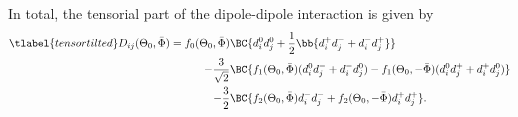 In total, the tensorial part of the dipole-dipole interaction is given by
\begin{align} \tlabel{tensortilted}
    D_{ij}(\Theta_0, \bar\Phi) = f_0(\Theta_0, \bar \Phi) &\BC{ d_i^0 d_j^0 + \frac{1}{2}\bb{d_i^+ d_j^- + d_i^- d_j^+} } \\
    \qquad-\frac{3}{\sqrt{2}} &\BC{ f_1(\Theta_0, \bar \Phi)  (d_i^0 d_j^- + d_i^- d_j^0) - f_1(\Theta_0, -\bar \Phi) (d_i^0 d_j^+ + d_i^+ d_j^0) }\\
    \qquad-\frac{3}{2} &\BC{ f_2(\Theta_0, \bar \Phi) d_i^- d_j^- + f_2(\Theta_0, -\bar \Phi) d_i^+ d_j^+ }.
\end{align}


